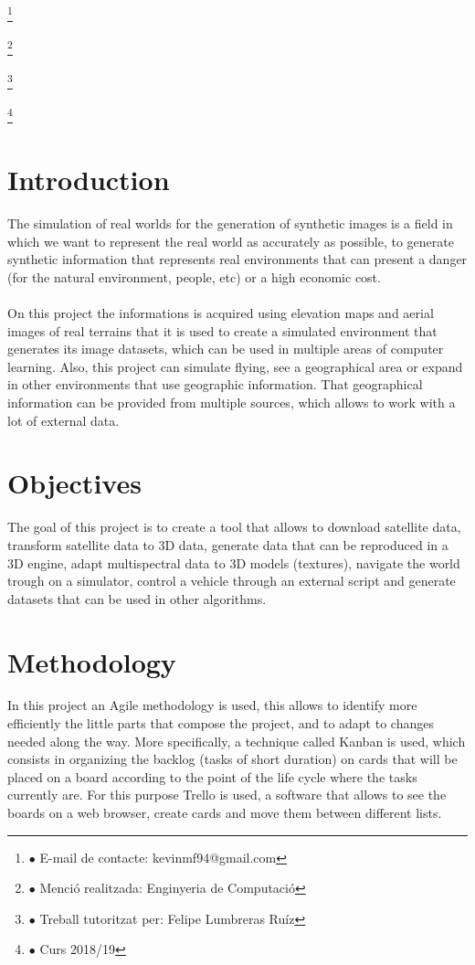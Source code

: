 \documentclass[10pt,a4paper,twocolumn,twoside]{article}
\newcommand\blfootnote[1]{%
  \begingroup
  \renewcommand\thefootnote{}\footnote{#1}%
  \addtocounter{footnote}{-1}%
  \endgroup
}
\begin{document}
\blfootnote{$\bullet$ E-mail de contacte: kevinmf94@gmail.com}
\blfootnote{$\bullet$ Menció realitzada: Enginyeria de Computació}
\blfootnote{$\bullet$ Treball tutoritzat per: Felipe Lumbreras Ruíz}
\blfootnote{$\bullet$ Curs 2018/19}

\vspace{-1cm}
\section{Introduction}
The simulation of real worlds for the generation of synthetic images is a field in which we want to represent the real world as accurately as possible, to generate synthetic information that represents real environments that can present a danger (for the natural environment, people, etc) or a high economic cost.
\\
\\
On this project the informations is acquired using elevation maps and aerial images of real terrains that it is used to create a simulated environment that generates its image datasets, which can be used in multiple areas of computer learning. Also, this project can simulate flying, see a geographical area or expand in other environments that use geographic information. That geographical information can be provided from multiple sources, which allows to work with a lot of external data.

\section{Objectives}

The goal of this project is to create a tool that allows to download satellite data, transform satellite data to 3D data, generate data that can be reproduced in a 3D engine, adapt multispectral data to 3D models (textures), navigate the world trough on a simulator, control a vehicle through an external script and generate datasets that can be used in other algorithms.

\section{Methodology}
In this project an Agile methodology is used,  this allows to identify more efficiently the little parts that compose the project, and to adapt to changes needed along the way. More specifically, a technique called Kanban\cite{kanban} is used, which consists in organizing the backlog (tasks of short duration) on cards that will be placed on a board according to the point of the life cycle where the tasks currently are. For this purpose Trello\cite{trello} is used, a software that allows to see the boards on a web browser, create cards and move them between different lists.
\end{document}
